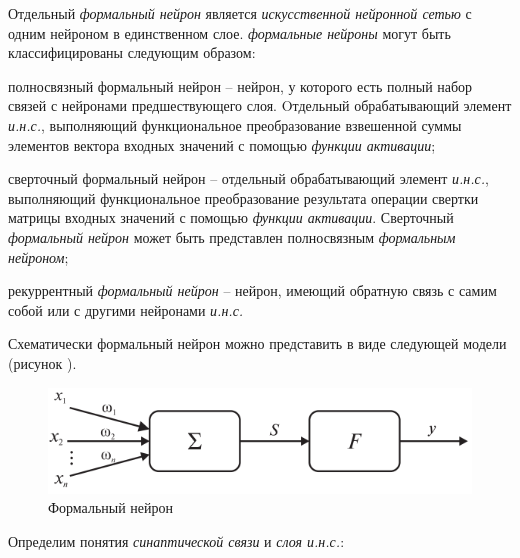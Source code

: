 Отдельный \textit{формальный нейрон} является \textit{искусственной нейронной сетью} с одним нейроном в единственном слое.
\textit{формальные нейроны} могут быть классифицированы следующим образом:
\begin{textitemize}
	\item полносвязный формальный нейрон -- нейрон, у которого есть полный набор связей с нейронами предшествующего слоя. Oтдельный обрабатывающий элемент \textit{и.н.с.}, выполняющий функциональное преобразование взвешенной суммы элементов вектора входных значений с помощью \textit{функции активации};
	\item сверточный формальный нейрон -- отдельный обрабатывающий элемент \textit{и.н.с.}, выполняющий функциональное преобразование результата операции свертки матрицы входных значений с помощью \textit{функции активации}. Сверточный \textit{формальный нейрон} может быть представлен полносвязным \textit{формальным нейроном};
	\item рекуррентный \textit{формальный нейрон} -- нейрон, имеющий обратную связь с самим собой или с другими нейронами \textit{и.н.с.}
\end{textitemize}

Схематически формальный нейрон можно представить в виде следующей модели (рисунок \textit{}).

\begin{figure}[H]
	\centering
	\includegraphics[scale=0.4]{author/part3/figures/formal_neuron.png}
	\caption{Формальный нейрон}
	\label{fig:formal_neuron}
\end{figure}

Определим понятия \textit{синаптической связи} и \textit{слоя и.н.с.}:

\begin{SCn}

\end{SCn}

